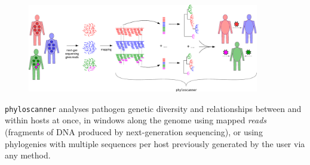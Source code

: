 \documentclass{article}
\title{\p}
\date{Last updated \today}
\author{Chris Wymant and Matthew Hall}
\newcommand{\p}{\texttt{phyloscanner}\xspace}
\begin{document}
\maketitle


\begin{figure}[!h]
\centering
\includegraphics[width=0.9\textwidth]{InfoAndInputs/PhyloscannerDiagram_big4.pdf}
\end{figure}

\p analyses pathogen genetic diversity and relationships between and within hosts at once, in windows along the genome using mapped {\it reads} (fragments of DNA produced by next-generation sequencing), or using phylogenies with multiple sequences per host previously generated by the user via any method.



\end{document}

